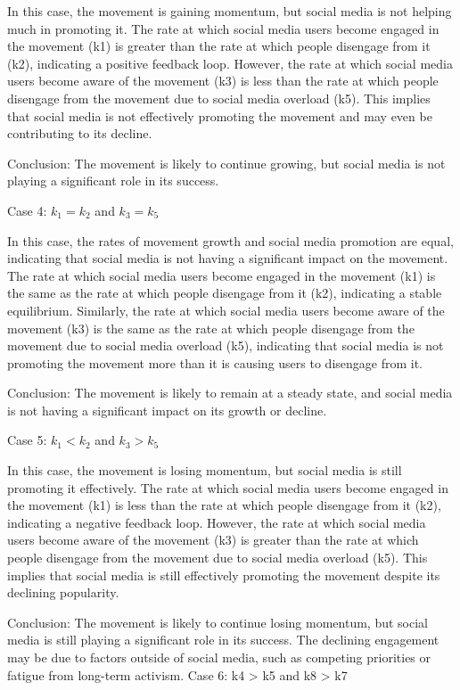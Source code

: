 \documentclass{article}
\begin{document}
In this case, the movement is gaining momentum, but social media is not helping much in promoting it. The rate at which social media users become engaged in the movement (k1) is greater than the rate at which people disengage from it (k2), indicating a positive feedback loop. However, the rate at which social media users become aware of the movement (k3) is less than the rate at which people disengage from the movement due to social media overload (k5). This implies that social media is not effectively promoting the movement and may even be contributing to its decline.

Conclusion: The movement is likely to continue growing, but social media is not playing a significant role in its success.

Case 4: $k_1 = k_2$ and $k_3 = k_5$

In this case, the rates of movement growth and social media promotion are equal, indicating that social media is not having a significant impact on the movement. The rate at which social media users become engaged in the movement (k1) is the same as the rate at which people disengage from it (k2), indicating a stable equilibrium. Similarly, the rate at which social media users become aware of the movement (k3) is the same as the rate at which people disengage from the movement due to social media overload (k5), indicating that social media is not promoting the movement more than it is causing users to disengage from it.

Conclusion: The movement is likely to remain at a steady state, and social media is not having a significant impact on its growth or decline.

Case 5: $k_1 < k_2$ and $k_3 > k_5$

In this case, the movement is losing momentum, but social media is still promoting it effectively. The rate at which social media users become engaged in the movement (k1) is less than the rate at which people disengage from it (k2), indicating a negative feedback loop. However, the rate at which social media users become aware of the movement (k3) is greater than the rate at which people disengage from the movement due to social media overload (k5). This implies that social media is still effectively promoting the movement despite its declining popularity.

Conclusion: The movement is likely to continue losing momentum, but social media is still playing a significant role in its success. The declining engagement may be due to factors outside of social media, such as competing priorities or fatigue from long-term activism.
Case 6: k4 > k5 and k8 > k7
\end{document}
